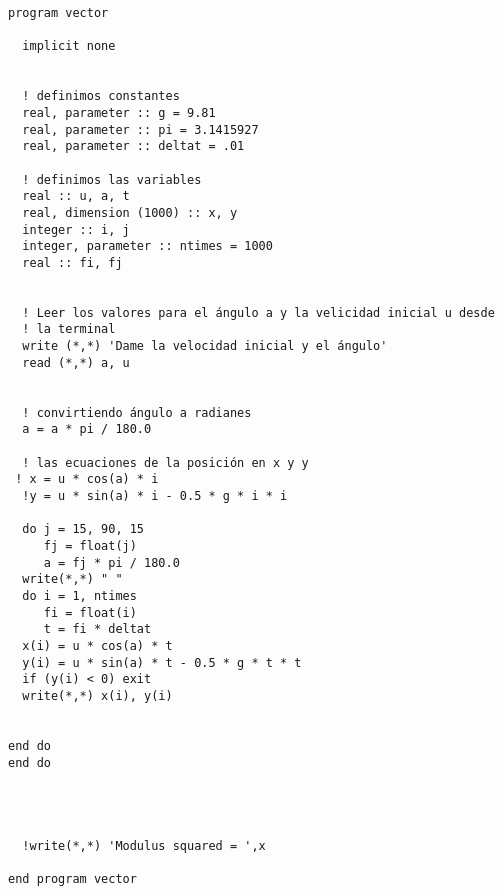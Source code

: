 \documentclass{article}
\begin{document}
\begin{verbatim}
program vector

  implicit none


  ! definimos constantes
  real, parameter :: g = 9.81
  real, parameter :: pi = 3.1415927
  real, parameter :: deltat = .01

  ! definimos las variables
  real :: u, a, t
  real, dimension (1000) :: x, y
  integer :: i, j
  integer, parameter :: ntimes = 1000
  real :: fi, fj 
 

  ! Leer los valores para el ángulo a y la velicidad inicial u desde
  ! la terminal
  write (*,*) 'Dame la velocidad inicial y el ángulo'
  read (*,*) a, u

  
  ! convirtiendo ángulo a radianes
  a = a * pi / 180.0
  
  ! las ecuaciones de la posición en x y y
 ! x = u * cos(a) * i
  !y = u * sin(a) * i - 0.5 * g * i * i
  
  do j = 15, 90, 15
     fj = float(j)
     a = fj * pi / 180.0
  write(*,*) " "
  do i = 1, ntimes
     fi = float(i)
     t = fi * deltat
  x(i) = u * cos(a) * t
  y(i) = u * sin(a) * t - 0.5 * g * t * t
  if (y(i) < 0) exit
  write(*,*) x(i), y(i)
  

end do
end do

 
 

  !write(*,*) 'Modulus squared = ',x

end program vector

\end{verbatim}
\end{document}
